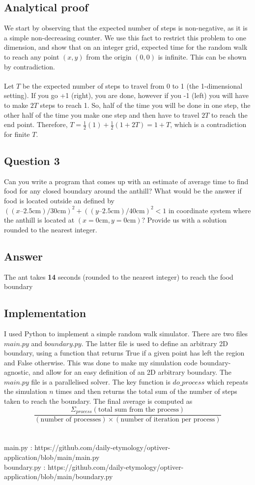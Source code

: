 \documentclass{article}
\begin{document}
\subsection{Analytical proof}
We start by observing that the expected number of steps is non-negative, as it is a simple non-decreasing counter. We use this fact to restrict this problem to one dimension, and show that on an integer grid, expected time for the random walk to reach any point $(x,y)$ from the origin $(0,0)$ is infinite. This can be shown by contradiction. 
\\~\\
\noindent Let $T$ be the expected number of steps to travel from 0 to 1 (the 1-dimensional setting). If you go +1 (right), you are done, however if you -1 (left) you will have to make $2T$ steps to reach 1. So, half of the time you will be done in one step, the other half of the time you make one step and then have to travel $2T$ to reach the end point. Therefore, $T=\frac{1}{2}(1) + \frac{1}{2}(1+2T) = 1 + T$, which is a contradiction for finite $T$.


\subsection{Question 3}
Can you write a program that comes up with an estimate of average time to find food for any closed boundary around the anthill? What would be the answer if food is located outside an defined by $( (x – 2.5\text{cm}) / 30\text{cm} )^2 + ( (y – 2.5\text{cm}) / 40\text{cm} )^2 < 1$ in coordinate system where the anthill is located at $(x = 0\text{cm}, y = 0\text{cm})$? Provide us with a solution rounded to the nearest integer.

\subsection{Answer}
The ant takes \textbf{14} seconds (rounded to the nearest integer) to reach the food boundary

\subsection{Implementation}
I used Python to implement a simple random walk simulator. There are two files $main.py$ and $boundary.py$. The latter file is used to define an arbitrary 2D boundary, using a function that returns True if a given point has left the region and False otherwise. This was done to make my simulation code boundary-agnostic, and allow for an easy definition of an 2D arbitrary boundary. The $main.py$ file is a parallelised solver. The key function is $do\_process$ which repeats the simulation $n$ times and then returns the total sum of the number of steps taken to reach the boundary. The final average is computed as $$\frac{\Sigma_{process}(\text{total sum from the process})}{(\text{number of processes})\times(\text{number of iteration per process})}$$
\\~\\
main.py : https://github.com/daily-etymology/optiver-application/blob/main/main.py\\
boundary.py : https://github.com/daily-etymology/optiver-application/blob/main/boundary.py
\end{document}
